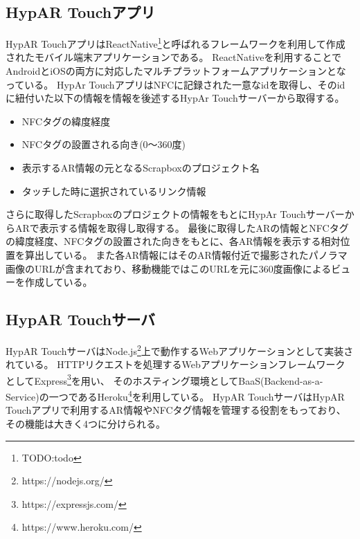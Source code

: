 \subsection{HypAR Touchアプリ}
HypAR TouchアプリはReactNative\footnote{\textsf{TODO:todo}}と呼ばれるフレームワークを利用して作成されたモバイル端末アプリケーションである。
ReactNativeを利用することでAndroidとiOSの両方に対応したマルチプラットフォームアプリケーションとなっている。
HypAr TouchアプリはNFCに記録された一意なidを取得し、そのidに紐付いた以下の情報を情報を後述するHypAr Touchサーバーから取得する。
\begin{itemize}
  \item NFCタグの緯度経度
  \item NFCタグの設置される向き(0〜360度)
  \item 表示するAR情報の元となるScrapboxのプロジェクト名
  \item タッチした時に選択されているリンク情報
\end{itemize}
さらに取得したScrapboxのプロジェクトの情報をもとにHypAr TouchサーバーからARで表示する情報を取得し取得する。
最後に取得したARの情報とNFCタグの緯度経度、NFCタグの設置された向きをもとに、各AR情報を表示する相対位置を算出している。
また各AR情報にはそのAR情報付近で撮影されたパノラマ画像のURLが含まれており、移動機能ではこのURLを元に360度画像によるビューを作成している。

\subsection{HypAR Touchサーバ}
HypAR TouchサーバはNode.js\footnote{\textsf{https://nodejs.org/}}上で動作するWebアプリケーションとして実装されている。
HTTPリクエストを処理するWebアプリケーションフレームワークとしてExpress\footnote{\textsf{https://expressjs.com/}}を用い、
そのホスティング環境としてBaaS(Backend-as-a-Service)の一つであるHeroku\footnote{\textsf{https://www.heroku.com/}}を利用している。
HypAR TouchサーバはHypAR Touchアプリで利用するAR情報やNFCタグ情報を管理する役割をもっており、その機能は大きく4つに分けられる。

